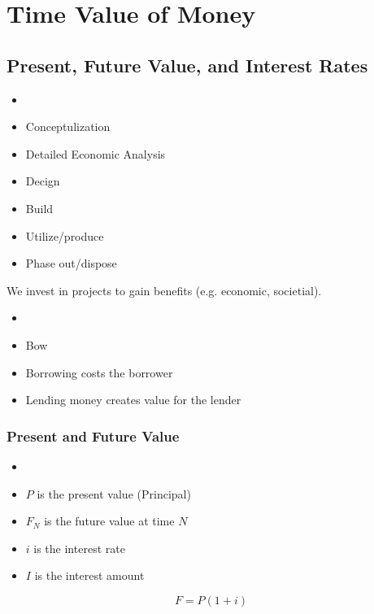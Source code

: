 \chapter{Time Value of Money }
\section{Present, Future Value, and Interest Rates}
\begin{theorem}
    \begin{itemize}
        \item[]
        \item Conceptulization
        \item Detailed Economic Analysis
        \item Decign
        \item Build
        \item Utilize/produce
        \item Phase out/dispose
    \end{itemize}
\end{theorem}

\begin{remark}
    We invest in projects to gain benefits  (e.g. economic, societial).
\end{remark}

\begin{theorem}
    \begin{itemize}
        \item[]
        \item Bow
        \item Borrowing costs the borrower
        \item Lending money creates value for the lender
    \end{itemize}
\end{theorem}

\subsection{Present and Future Value}
\begin{vocabulary}
    \begin{itemize}
        \item[]
        \item $P$ is the present value (Principal)
        \item $F_N$ is the future value at time $N$
        \item $i$ is the interest rate
        \item $I$ is the interest amount
    \end{itemize}
\end{vocabulary}
\begin{theorem}
    \begin{equation}
        F = P(1+i)
    \end{equation}

\end{theorem}
